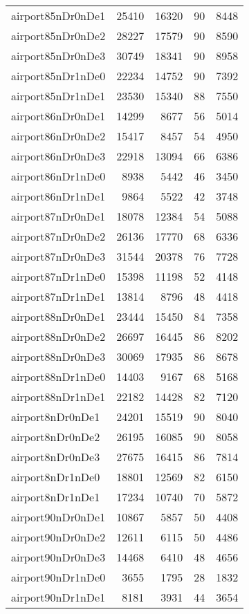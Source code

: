 \begin{longtable}{lrrrr}
airport85nDr0nDe1 & 25410 & 16320 & 90 & 8448 \\
airport85nDr0nDe2 & 28227 & 17579 & 90 & 8590 \\
airport85nDr0nDe3 & 30749 & 18341 & 90 & 8958 \\
airport85nDr1nDe0 & 22234 & 14752 & 90 & 7392 \\
airport85nDr1nDe1 & 23530 & 15340 & 88 & 7550 \\
airport86nDr0nDe1 & 14299 & 8677 & 56 & 5014 \\
airport86nDr0nDe2 & 15417 & 8457 & 54 & 4950 \\
airport86nDr0nDe3 & 22918 & 13094 & 66 & 6386 \\
airport86nDr1nDe0 & 8938 & 5442 & 46 & 3450 \\
airport86nDr1nDe1 & 9864 & 5522 & 42 & 3748 \\
airport87nDr0nDe1 & 18078 & 12384 & 54 & 5088 \\
airport87nDr0nDe2 & 26136 & 17770 & 68 & 6336 \\
airport87nDr0nDe3 & 31544 & 20378 & 76 & 7728 \\
airport87nDr1nDe0 & 15398 & 11198 & 52 & 4148 \\
airport87nDr1nDe1 & 13814 & 8796 & 48 & 4418 \\
airport88nDr0nDe1 & 23444 & 15450 & 84 & 7358 \\
airport88nDr0nDe2 & 26697 & 16445 & 86 & 8202 \\
airport88nDr0nDe3 & 30069 & 17935 & 86 & 8678 \\
airport88nDr1nDe0 & 14403 & 9167 & 68 & 5168 \\
airport88nDr1nDe1 & 22182 & 14428 & 82 & 7120 \\
airport8nDr0nDe1 & 24201 & 15519 & 90 & 8040 \\
airport8nDr0nDe2 & 26195 & 16085 & 90 & 8058 \\
airport8nDr0nDe3 & 27675 & 16415 & 86 & 7814 \\
airport8nDr1nDe0 & 18801 & 12569 & 82 & 6150 \\
airport8nDr1nDe1 & 17234 & 10740 & 70 & 5872 \\
airport90nDr0nDe1 & 10867 & 5857 & 50 & 4408 \\
airport90nDr0nDe2 & 12611 & 6115 & 50 & 4486 \\
airport90nDr0nDe3 & 14468 & 6410 & 48 & 4656 \\
airport90nDr1nDe0 & 3655 & 1795 & 28 & 1832 \\
airport90nDr1nDe1 & 8181 & 3931 & 44 & 3654 \\

\end{longtable}
